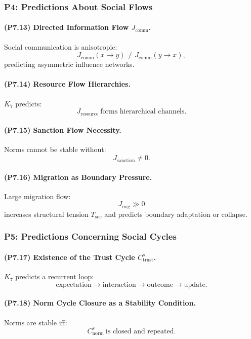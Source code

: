 \subsubsection{P4: Predictions About Social Flows}

\paragraph{(P7.13) Directed Information Flow $J_{\mathrm{comm}}$.}
Social communication is anisotropic:
\[
J_{\mathrm{comm}}(x \to y) \neq J_{\mathrm{comm}}(y \to x),
\]
predicting asymmetric influence networks.

\paragraph{(P7.14) Resource Flow Hierarchies.}
$K_7$ predicts:
\[
J_{\mathrm{resource}} \ \text{forms hierarchical channels}.
\]

\paragraph{(P7.15) Sanction Flow Necessity.}
Norms cannot be stable without:
\[
J_{\mathrm{sanction}} \neq 0.
\]

\paragraph{(P7.16) Migration as Boundary Pressure.}
Large migration flow:
\[
J_{\mathrm{mig}} \gg 0
\]
increases structural tension $T_{\mathrm{soc}}$ and predicts boundary adaptation or collapse.

\subsubsection{P5: Predictions Concerning Social Cycles}

\paragraph{(P7.17) Existence of the Trust Cycle $C_{\mathrm{trust}}^s$.}
$K_7$ predicts a recurrent loop:
\[
\text{expectation} \to \text{interaction} \to \text{outcome} \to \text{update}.
\]

\paragraph{(P7.18) Norm Cycle Closure as a Stability Condition.}
Norms are stable iff:
\[
C_{\mathrm{norm}}^s \ \text{is closed and repeated}.
\]

